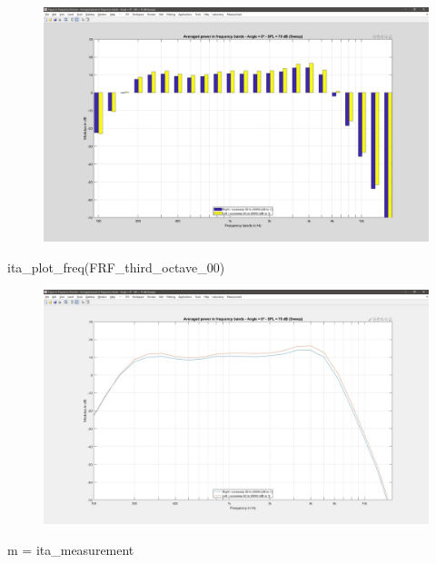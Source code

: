 \documentclass[12pt, a4paper, twoside, onecolumn]{article}%
\begin{document}
\begin{figure}[H] \centering
\includegraphics[width=.7\textwidth]{Figures/E20.jpg}
\end{figure}

\pagebreak
\begin{matlabbox}
ita_plot_freq(FRF_third_octave_00)
\end{matlabbox}

\begin{figure}[H] \centering
\includegraphics[width=.7\textwidth]{Figures/E21.jpg}
\end{figure}

\begin{matlabbox}
m = ita_measurement
\end{matlabbox}
\end{document}
